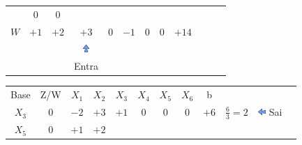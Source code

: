\documentclass{beamer}
\begin{document}
\begin{frame}
{\begin{table}
\begin{tabular}{c c c c c c c c c c c c}
				& \cellcolor{yellow!50} $\scriptstyle 0$ 
				& \cellcolor{gray!50} $\scriptstyle 0$  \\
				\cellcolor{blue!100} \color{white} $\scriptstyle W$
				& \cellcolor{yellow!90} $\scriptstyle +1$
				& \cellcolor{yellow!90} $\scriptstyle +2$
				& \cellcolor{gray!50} $\scriptstyle +3$
				& \cellcolor{yellow!90} $\scriptstyle 0$
				& \cellcolor{yellow!90} $\scriptstyle -1$
				& \cellcolor{yellow!90} $\scriptstyle 0$
				& \cellcolor{yellow!90} $\scriptstyle 0$ 
				& \cellcolor{gray!50} $\scriptstyle +14$  \\
				& & &  \includegraphics[width=0.3cm,height=0.3cm]{setacima.jpg} \\
				& & &  \scriptsize Entra \\
			\end{tabular}
		\end{table}			
	}
	{
		\begin{table}		
			\begin{tabular}{c c c c c c c c c c c c}
				\cline{1-8} 
				\cellcolor{blue!100} \color{white} \scriptsize Base 
				&\cellcolor{blue!100} \color{white} \scriptsize Z/W
				&\cellcolor{blue!100} \color{white} $\scriptstyle X_1$ 
				&\cellcolor{blue!100} \color{white} $\scriptstyle X_2$ 
				&\cellcolor{blue!100} \color{red}   $\scriptstyle X_3$ 
				&\cellcolor{blue!100} \color{white} $\scriptstyle X_4$ 
				&\cellcolor{blue!100} \color{red}   $\scriptstyle X_5$ 
				&\cellcolor{blue!100} \color{red}   $\scriptstyle X_6$ 
				&\cellcolor{blue!100} \color{white} \scriptsize b \\
				\cellcolor{blue!100} \color{red} $\scriptstyle X_3$
				& \cellcolor{gray!50} $\scriptstyle 0$
				& \cellcolor{gray!50} $\scriptstyle -2$
				& \cellcolor{red!50} $\scriptstyle +3$
				& \cellcolor{gray!50} $\scriptstyle +1$
				& \cellcolor{gray!50} $\scriptstyle 0$
				& \cellcolor{gray!50} $\scriptstyle 0$
				& \cellcolor{gray!50} $\scriptstyle 0$
				& \cellcolor{gray!50} $\scriptstyle +6$ 
				& $ \scriptstyle \frac{6}{3} = 2$
				& \includegraphics[width=0.3cm,height=0.3cm]{setaesquerda.jpg} \scriptsize Sai \\
			    \cellcolor{blue!100} \color{red} $\scriptstyle X_5$
				& \cellcolor{yellow!50} $\scriptstyle 0$
				& \cellcolor{yellow!50} $\scriptstyle +1$
				& \cellcolor{gray!50} $\scriptstyle +2$

\end{tabular}
\end{table}}
\end{frame}
\end{document}
